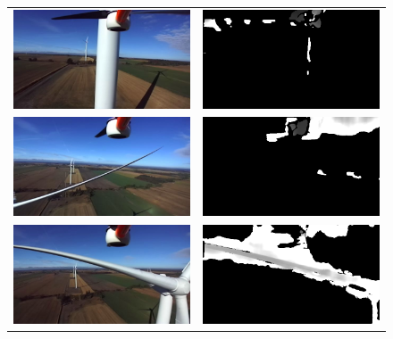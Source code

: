 \begin{figure}
  \begin{tabular}{cc}
    \includegraphics[width=0.5\linewidth]{images/field_stereo_fail_rgb.png} &
    \includegraphics[width=0.5\linewidth]{images/field_stereo_fail_pcl.png} \\
    \includegraphics[width=0.5\linewidth]{images/field_stereo_fail_rgb2.png} &
    \includegraphics[width=0.5\linewidth]{images/field_stereo_fail_pcl2.png} \\
    \includegraphics[width=0.5\linewidth]{images/field_stereo_success_rgb.png} &
    \includegraphics[width=0.5\linewidth]{images/field_stereo_success_pcl.png} \\

\end{tabular}
\end{figure}
